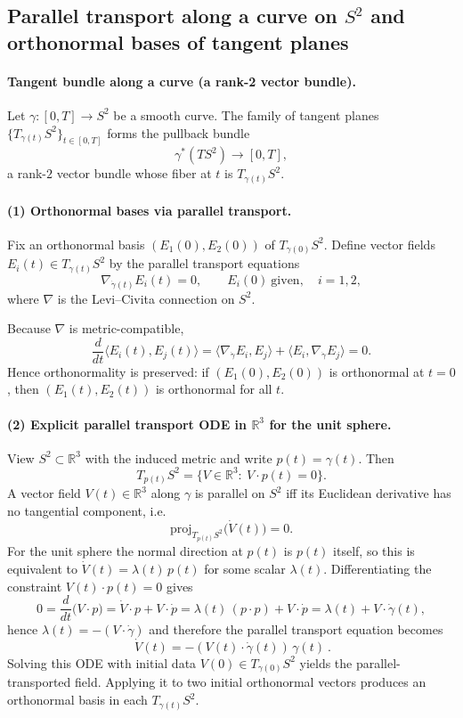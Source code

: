 \documentclass[12pt,a4paper]{article}
\theoremstyle{plain}
\theoremstyle{definition}      %
\begin{document}
	\subsection*{Parallel transport along a curve on $S^2$ and orthonormal bases of tangent planes}
	
	\paragraph{Tangent bundle along a curve (a rank-2 vector bundle).}
	Let $\gamma:[0,T]\to S^2$ be a smooth curve.
	The family of tangent planes $\{T_{\gamma(t)}S^2\}_{t\in[0,T]}$ forms the pullback bundle
	\[
	\gamma^*(TS^2)\to [0,T],
	\]
	a rank-$2$ vector bundle whose fiber at $t$ is $T_{\gamma(t)}S^2$.
	
	\paragraph{(1) Orthonormal bases via parallel transport.}
	Fix an orthonormal basis $(E_1(0),E_2(0))$ of $T_{\gamma(0)}S^2$.
	Define vector fields $E_i(t)\in T_{\gamma(t)}S^2$ by the parallel transport equations
	\[
	\nabla_{\dot\gamma(t)}E_i(t)=0,\qquad E_i(0)\ \text{given},\quad i=1,2,
	\]
	where $\nabla$ is the Levi--Civita connection on $S^2$.
	
	Because $\nabla$ is metric-compatible,
	\[
	\frac{d}{dt}\langle E_i(t),E_j(t)\rangle
	=
	\langle \nabla_{\dot\gamma}E_i, E_j\rangle + \langle E_i,\nabla_{\dot\gamma}E_j\rangle = 0.
	\]
	Hence orthonormality is preserved:
	if $(E_1(0),E_2(0))$ is orthonormal at $t=0$, then $(E_1(t),E_2(t))$ is orthonormal for all $t$.
	
	\paragraph{(2) Explicit parallel transport ODE in $\mathbb{R}^3$ for the unit sphere.}
	View $S^2\subset\mathbb{R}^3$ with the induced metric and write $p(t)=\gamma(t)$.
	Then
	\[
	T_{p(t)}S^2=\{V\in\mathbb{R}^3:\ V\cdot p(t)=0\}.
	\]
	A vector field $V(t)\in\mathbb{R}^3$ along $\gamma$ is parallel on $S^2$ iff its Euclidean derivative
	has no tangential component, i.e.
	\[
	\mathrm{proj}_{T_{p(t)}S^2}\big(\dot V(t)\big)=0.
	\]
	For the unit sphere the normal direction at $p(t)$ is $p(t)$ itself, so this is equivalent to
	$\dot V(t)=\lambda(t)\,p(t)$ for some scalar $\lambda(t)$.
	Differentiating the constraint $V(t)\cdot p(t)=0$ gives
	\[
	0=\frac{d}{dt}\big(V\cdot p\big)=\dot V\cdot p + V\cdot \dot p
	= \lambda(t)\, (p\cdot p) + V\cdot \dot p
	= \lambda(t) + V\cdot \dot\gamma(t),
	\]
	hence $\lambda(t)=-(V\cdot \dot\gamma)$ and therefore the parallel transport equation becomes
	\[
	\boxed{\ \dot V(t)=-(V(t)\cdot \dot\gamma(t))\,\gamma(t)\ }.
	\]
	Solving this ODE with initial data $V(0)\in T_{\gamma(0)}S^2$ yields the parallel-transported field.
	Applying it to two initial orthonormal vectors produces an orthonormal basis in each $T_{\gamma(t)}S^2$.
	
\end{document}
